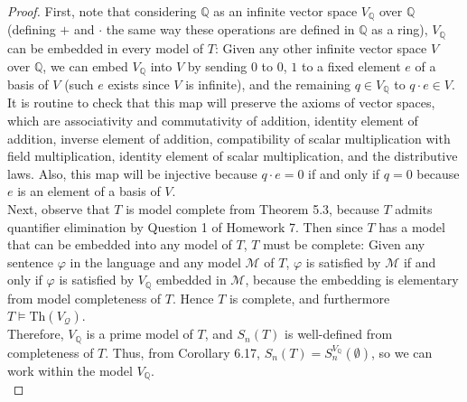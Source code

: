 \documentclass{article}
\begin{document}
\begin{enumerate}[label={\bf Q\arabic*:}]
    \begin{proof}
      First, note that considering $\mathbb{Q}$ as an infinite vector space
      $V_\mathbb{Q}$ over $\mathbb{Q}$ (defining $+$ and $\cdot$ the same
      way these operations are defined in $\mathbb{Q}$ as a ring),
      $V_\mathbb{Q}$ can be embedded in every model of $T$: Given any other
      infinite vector space $V$ over $\mathbb{Q}$, we can embed
      $V_\mathbb{Q}$ into $V$ by sending $0$ to $0$, $1$ to a fixed element
      $e$ of a basis of $V$ (such $e$ exists since $V$ is infinite), and
      the remaining $q\in V_\mathbb{Q}$ to $q\cdot e\in V$. It is routine
      to check that this map will preserve the axioms of vector spaces,
      which are associativity and commutativity of addition, identity
      element of addition, inverse element of addition, compatibility of
      scalar multiplication with field multiplication, identity element of
      scalar multiplication, and the distributive laws. Also, this map will
      be injective because $q\cdot e=0$ if and only if $q=0$ because $e$ is
      an element of a basis of $V$. \\

      Next, observe that $T$ is model complete from Theorem 5.3, because
      $T$ admits quantifier elimination by Question 1 of Homework 7. Then
      since $T$ has a model that can be embedded into any model of $T$, $T$
      must be complete: Given any sentence $\varphi$ in the language and
      any model $\mathcal{M}$ of $T$, $\varphi$ is satisfied by
      $\mathcal{M}$ if and only if $\varphi$ is satisfied by
      $V_\mathbb{Q}$ embedded in $\mathcal{M}$, because the embedding is
      elementary from model completeness of $T$. Hence $T$ is complete, and
      furthermore $T\models\text{Th}(V_\mathcal{Q})$. \\

      Therefore, $V_\mathbb{Q}$ is a prime model of $T$, and $S_n(T)$ is
      well-defined from completeness of $T$. Thus, from Corollary 6.17,
      $S_n(T)= S_n^{V_{\mathbb{Q}}}(\emptyset)$, so we can work within the
      model $V_\mathbb{Q}$. \\


\end{proof}
\end{enumerate}
\end{document}
